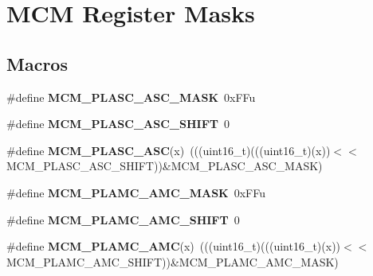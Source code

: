 \hypertarget{group___m_c_m___register___masks}{}\section{M\+CM Register Masks}
\label{group___m_c_m___register___masks}
\subsection*{Macros}
\begin{DoxyCompactItemize}
\item 
\mbox{\label{group___m_c_m___register___masks_ga215cf860c41174735020a34e7ccf9590}} 
\#define {\bfseries M\+C\+M\+\_\+\+P\+L\+A\+S\+C\+\_\+\+A\+S\+C\+\_\+\+M\+A\+SK}~0x\+F\+Fu
\item 
\mbox{\label{group___m_c_m___register___masks_ga88f833168fd51e1b3c950e21b00bbfc3}} 
\#define {\bfseries M\+C\+M\+\_\+\+P\+L\+A\+S\+C\+\_\+\+A\+S\+C\+\_\+\+S\+H\+I\+FT}~0
\item 
\mbox{\label{group___m_c_m___register___masks_gaaae648a9e1b6e2e44af89bb3a6881a54}} 
\#define {\bfseries M\+C\+M\+\_\+\+P\+L\+A\+S\+C\+\_\+\+A\+SC}(x)~(((uint16\+\_\+t)(((uint16\+\_\+t)(x))$<$$<$M\+C\+M\+\_\+\+P\+L\+A\+S\+C\+\_\+\+A\+S\+C\+\_\+\+S\+H\+I\+FT))\&M\+C\+M\+\_\+\+P\+L\+A\+S\+C\+\_\+\+A\+S\+C\+\_\+\+M\+A\+SK)
\item 
\mbox{\label{group___m_c_m___register___masks_ga7988227df54012705c7f522f348214ee}} 
\#define {\bfseries M\+C\+M\+\_\+\+P\+L\+A\+M\+C\+\_\+\+A\+M\+C\+\_\+\+M\+A\+SK}~0x\+F\+Fu
\item 
\mbox{\label{group___m_c_m___register___masks_gaa1b3153d0bf749f80fffacd948dd4bd4}} 
\#define {\bfseries M\+C\+M\+\_\+\+P\+L\+A\+M\+C\+\_\+\+A\+M\+C\+\_\+\+S\+H\+I\+FT}~0
\item 
\mbox{\label{group___m_c_m___register___masks_gad8199ccd7b6edb29bcd5e940d17e7e47}} 
\#define {\bfseries M\+C\+M\+\_\+\+P\+L\+A\+M\+C\+\_\+\+A\+MC}(x)~(((uint16\+\_\+t)(((uint16\+\_\+t)(x))$<$$<$M\+C\+M\+\_\+\+P\+L\+A\+M\+C\+\_\+\+A\+M\+C\+\_\+\+S\+H\+I\+FT))\&M\+C\+M\+\_\+\+P\+L\+A\+M\+C\+\_\+\+A\+M\+C\+\_\+\+M\+A\+SK)

\end{DoxyCompactItemize}
